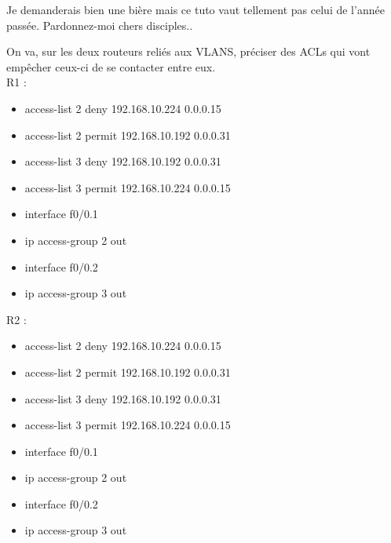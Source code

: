 \documentclass[a4paper,10pt,final,fleqn]{article}
\begin{document}
	Je demanderais bien une bière mais ce tuto vaut tellement pas celui de l'année passée. Pardonnez-moi chers disciples..\

	On va, sur les deux routeurs reliés aux VLANS, préciser des ACLs qui vont empêcher ceux-ci de se contacter entre eux.\\

	R1 : \\

	\begin{itemize}
		\item access-list 2 deny 192.168.10.224 0.0.0.15
		\item access-list 2 permit 192.168.10.192 0.0.0.31\\

		\item access-list 3 deny 192.168.10.192 0.0.0.31 \\
		\item access-list 3 permit 192.168.10.224 0.0.0.15\\

		\item interface f0/0.1
		\item ip access-group 2 out\\

		\item interface f0/0.2
		\item ip access-group 3 out\\
	\end{itemize}

	R2 : \\

	\begin{itemize}
		\item access-list 2 deny 192.168.10.224 0.0.0.15
		\item access-list 2 permit 192.168.10.192 0.0.0.31\\

		\item access-list 3 deny 192.168.10.192 0.0.0.31
		\item access-list 3 permit 192.168.10.224 0.0.0.15\\

		\item interface f0/0.1
		\item ip access-group 2 out\\

		\item interface f0/0.2
		\item ip access-group 3 out\\

	\end{itemize}
\end{document}
